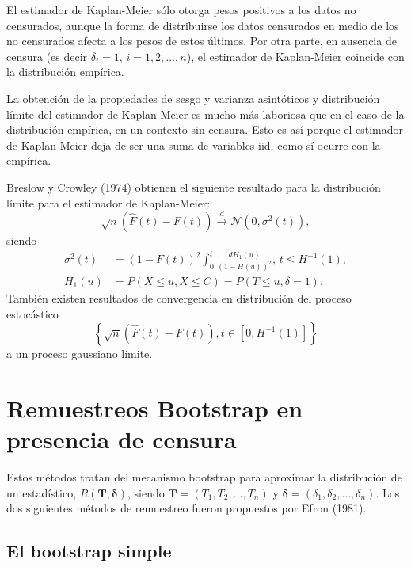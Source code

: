 \documentclass[]{book}
\theoremstyle{definition}
\theoremstyle{definition}
\theoremstyle{definition}
\theoremstyle{remark}
\begin{document}
El estimador de Kaplan-Meier sólo otorga pesos positivos a los datos no
censurados, aunque la forma de distribuirse los datos censurados en
medio de los no censurados afecta a los pesos de estos últimos. Por otra
parte, en ausencia de censura (es decir \(\delta _i=1\),
\(i=1,2,\ldots ,n\)), el estimador de Kaplan-Meier coincide con la
distribución empírica.

La obtención de la propiedades de sesgo y varianza asintóticos y
distribución límite del estimador de Kaplan-Meier es mucho más laboriosa
que en el caso de la distribución empírica, en un contexto sin censura.
Esto es así porque el estimador de Kaplan-Meier deja de ser una suma de
variables iid, como sí ocurre con la empírica.

Breslow y Crowley (1974) obtienen el siguiente resultado para la
distribución límite para el estimador de Kaplan-Meier:
\[\sqrt{n}\left( \hat{F}\left( t \right) -F\left( t \right) \right) 
\overset{d}{\longrightarrow} \mathcal{N}\left( 0,\sigma^2\left( t \right)
\right),\] siendo \[\begin{aligned}
\sigma^2\left( t \right) &= \left( 1-F\left( t \right) \right)
^2\int_{0}^{t}\frac{dH_1\left( u \right)}{\left( 1-H\left( u \right)
 \right)^2}\text{, }t\leq H^{-1}(1) , \\
H_1\left( u \right) &= P\left( X\leq u,X\leq C \right) =P\left( T\leq
u,\delta =1 \right).
\end{aligned}\] También existen resultados de convergencia en
distribución del proceso estocástico
\[\left\{ \sqrt{n}\left( \hat{F}\left( t \right) - F\left( t \right)
 \right), t \in \left[ 0,H^{-1}(1) \right] \right\}\] a un proceso
gaussiano límite.

\section{Remuestreos Bootstrap en presencia de
censura}\label{remuestreos-bootstrap-en-presencia-de-censura}

Estos métodos tratan del mecanismo bootstrap para aproximar la
distribución de un estadístico,
\(R\left( \mathbf{T}, \boldsymbol{\delta} \right)\), siendo
\(\mathbf{T}=\left( T_1, T_2, \ldots,T_n \right)\) y
\(\boldsymbol{\delta}=\left( \delta _1,\delta_2, \ldots ,\delta _n \right)\).
Los dos siguientes métodos de remuestreo fueron propuestos por Efron
(1981).

\subsection{El bootstrap simple}\label{el-bootstrap-simple}
\end{document}
